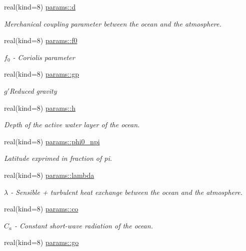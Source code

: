 \begin{DoxyCompactItemize}
real(kind=8) \hyperlink{namespaceparams_a612e8c87d1d9514ebe7ab3ac95141be3}{params\+::d}
\begin{DoxyCompactList}\small\item\em Merchanical coupling parameter between the ocean and the atmosphere. \end{DoxyCompactList}\item 
real(kind=8) \hyperlink{namespaceparams_a83c176b3a593aa6ac77c50d2b5b21032}{params\+::f0}
\begin{DoxyCompactList}\small\item\em $f_0$ -\/ Coriolis parameter \end{DoxyCompactList}\item 
real(kind=8) \hyperlink{namespaceparams_a29ba9893360b5685ca584deead6dbc55}{params\+::gp}
\begin{DoxyCompactList}\small\item\em $g'$Reduced gravity \end{DoxyCompactList}\item 
real(kind=8) \hyperlink{namespaceparams_a6d9c99d7dfc62518cf51eb98e7f39707}{params\+::h}
\begin{DoxyCompactList}\small\item\em Depth of the active water layer of the ocean. \end{DoxyCompactList}\item 
real(kind=8) \hyperlink{namespaceparams_a516e6c305e938087cfe780629c76ef64}{params\+::phi0\+\_\+npi}
\begin{DoxyCompactList}\small\item\em Latitude exprimed in fraction of pi. \end{DoxyCompactList}\item 
real(kind=8) \hyperlink{namespaceparams_a022da5c60234624dcc3d76382a7382da}{params\+::lambda}
\begin{DoxyCompactList}\small\item\em $\lambda$ -\/ Sensible + turbulent heat exchange between the ocean and the atmosphere. \end{DoxyCompactList}\item 
real(kind=8) \hyperlink{namespaceparams_a36a35eafddb662c94c227a30cbf85fd4}{params\+::co}
\begin{DoxyCompactList}\small\item\em $C_a$ -\/ Constant short-\/wave radiation of the ocean. \end{DoxyCompactList}\item 
real(kind=8) \hyperlink{namespaceparams_a30bd914fd64880f5407ebb055e72b88c}{params\+::go}

\end{DoxyCompactItemize}
